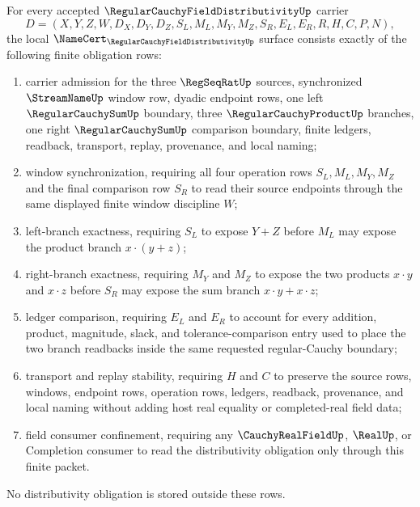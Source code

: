 \begin{theorem}
\label{thm:regular-cauchy-field-distributivity-obligations}
For every accepted $\RegularCauchyFieldDistributivityUp$ carrier
$$
D=(X,Y,Z,W,D_X,D_Y,D_Z,S_L,M_L,M_Y,M_Z,S_R,E_L,E_R,R,H,C,P,N),
$$
the local $\NameCert_{\RegularCauchyFieldDistributivityUp}$ surface consists exactly of the following finite obligation rows:
\begin{enumerate}
\item carrier admission for the three $\RegSeqRatUp$ sources, synchronized $\StreamNameUp$ window row, dyadic endpoint rows, one left $\RegularCauchySumUp$ boundary, three $\RegularCauchyProductUp$ branches, one right $\RegularCauchySumUp$ comparison boundary, finite ledgers, readback, transport, replay, provenance, and local naming;
\item window synchronization, requiring all four operation rows $S_L,M_L,M_Y,M_Z$ and the final comparison row $S_R$ to read their source endpoints through the same displayed finite window discipline $W$;
\item left-branch exactness, requiring $S_L$ to expose $Y+Z$ before $M_L$ may expose the product branch $x\cdot(y+z)$;
\item right-branch exactness, requiring $M_Y$ and $M_Z$ to expose the two products $x\cdot y$ and $x\cdot z$ before $S_R$ may expose the sum branch $x\cdot y+x\cdot z$;
\item ledger comparison, requiring $E_L$ and $E_R$ to account for every addition, product, magnitude, slack, and tolerance-comparison entry used to place the two branch readbacks inside the same requested regular-Cauchy boundary;
\item transport and replay stability, requiring $H$ and $C$ to preserve the source rows, windows, endpoint rows, operation rows, ledgers, readback, provenance, and local naming without adding host real equality or completed-real field data;
\item field consumer confinement, requiring any $\CauchyRealFieldUp$, $\RealUp$, or Completion consumer to read the distributivity obligation only through this finite packet.
\end{enumerate}
No distributivity obligation is stored outside these rows.
\end{theorem}

